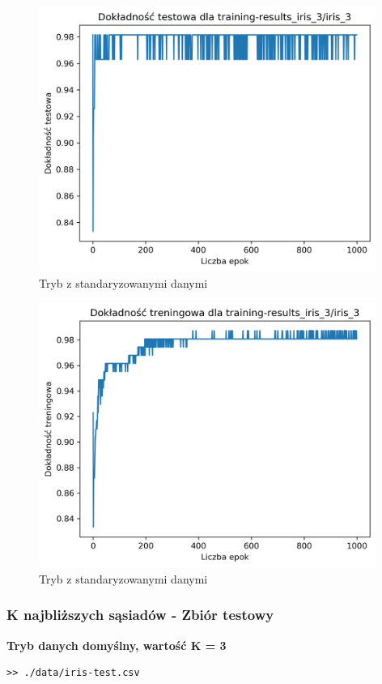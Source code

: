 \documentclass{classrep}
\begin{document}
{{{\begin{figure}[!htbp]
                    \centering
                    \includegraphics[width=110mm]{wykresy/iris_3_testing-accuracy.png}
                    \caption{Tryb z standaryzowanymi danymi}
                \end{figure}
                \begin{figure}[!htbp]
                    \centering
                    \includegraphics[width=110mm]{wykresy/iris_3_training-accuracy.png}
                    \caption{Tryb z standaryzowanymi danymi}
                \end{figure}
                \FloatBarrier
            }
            \subsubsection{K najbliższych sąsiadów - Zbiór testowy}
            {
                \textbf{Tryb danych domyślny, wartość K = 3}
                \begin{lstlisting}
>> ./data/iris-test.csv


\end{lstlisting}}}}
\end{document}
